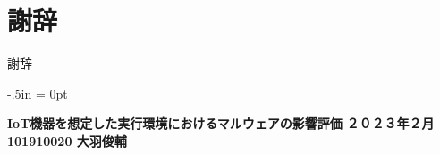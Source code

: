 \documentclass[12pt,a4paper,titlepage,report]{jsbook}
\begin{document}

\newpage
\renewcommand{\bibname}{参考文献}


\chapter*{謝辞}
謝辞

\clearpage
\thispagestyle{empty}
\oddsidemargin -2.5in
\evensidemargin -2.5in
\topmargin -.5in
\marginparwidth = 0pt
{
	\tate
	\begin{minipage}{8.0in}
		\small
		\textbf{IoT機器を想定した実行環境におけるマルウェアの影響評価}
		\hfill
		\textbf{２０２３年２月}
		\hfill
		\textbf{101910020 大羽俊輔}
	\end{minipage}
}
\end{document}
